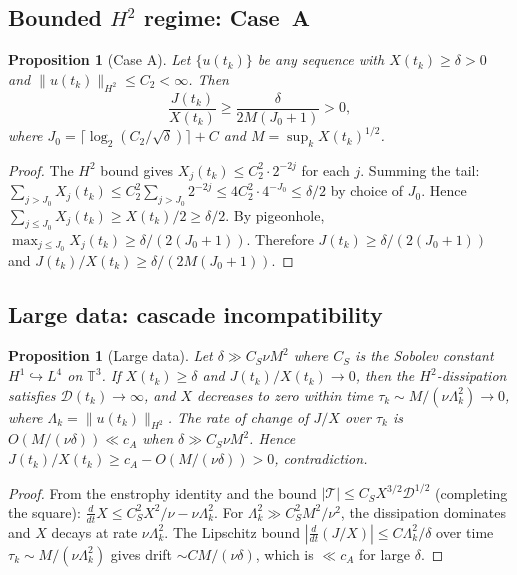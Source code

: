 \documentclass[11pt]{article}
\newtheorem{proposition}[theorem]{Proposition}
\newcommand{\norm}[2]{\|{#1}\|_{#2}}
\newcommand{\T}{\mathbb{T}}
\newcommand{\ddt}{\tfrac{d}{dt}}
\newcommand{\DD}{\mathcal{D}}
\begin{document}
\subsection{Bounded $H^2$ regime: Case~A}

\begin{proposition}[Case A]\label{prop:caseA}
Let $\{u(t_k)\}$ be any sequence with $X(t_k)\ge\delta>0$ and
$\norm{u(t_k)}{H^2}\le C_2<\infty$. Then
\[
  \frac{J(t_k)}{X(t_k)}
  \ge \frac{\delta}{2M(J_0+1)} > 0,
\]
where $J_0 = \lceil\log_2(C_2/\sqrt{\delta})\rceil + C$
and $M = \sup_k X(t_k)^{1/2}$.
\end{proposition}

\begin{proof}
The $H^2$ bound gives $X_j(t_k)\le C_2^2\cdot 2^{-2j}$ for each $j$.
Summing the tail:
$\sum_{j>J_0}X_j(t_k)\le C_2^2\sum_{j>J_0}2^{-2j}
\le 4C_2^2\cdot 4^{-J_0}\le\delta/2$
by choice of $J_0$.
Hence $\sum_{j\le J_0}X_j(t_k)\ge X(t_k)/2\ge\delta/2$.
By pigeonhole, $\max_{j\le J_0}X_j(t_k)\ge\delta/(2(J_0+1))$.
Therefore $J(t_k)\ge\delta/(2(J_0+1))$ and
$J(t_k)/X(t_k)\ge\delta/(2M(J_0+1))$.
\end{proof}

\subsection{Large data: cascade incompatibility}

\begin{proposition}[Large data]\label{prop:largedata}
Let $\delta\gg C_S\nu M^2$ where $C_S$ is the Sobolev constant
$H^1\hookrightarrow L^4$ on $\T^3$.
If $X(t_k)\ge\delta$ and $J(t_k)/X(t_k)\to0$, then the
$H^2$-dissipation satisfies $\DD(t_k)\to\infty$,
and $X$ decreases to zero within time
$\tau_k\sim M/(\nu\Lambda_k^2)\to0$,
where $\Lambda_k = \norm{u(t_k)}{H^2}$.
The rate of change of $J/X$ over $\tau_k$ is
$O(M/(\nu\delta))\ll c_A$ when $\delta\gg C_S\nu M^2$.
Hence $J(t_k)/X(t_k)\ge c_A - O(M/(\nu\delta)) > 0$,
contradiction.
\end{proposition}

\begin{proof}
From the enstrophy identity and the bound
$|\mathcal{T}|\le C_S X^{3/2}\DD^{1/2}$ (completing the square):
$\ddt X\le C_S^2 X^2/\nu - \nu\Lambda_k^2$.
For $\Lambda_k^2\gg C_S^2 M^2/\nu^2$, the dissipation dominates
and $X$ decays at rate $\nu\Lambda_k^2$.
The Lipschitz bound $|\ddt(J/X)|\le C\Lambda_k^2/\delta$ over
time $\tau_k\sim M/(\nu\Lambda_k^2)$ gives drift
$\sim CM/(\nu\delta)$, which is $\ll c_A$ for large $\delta$.
\end{proof}
\end{document}

